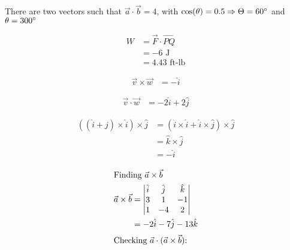 \documentclass[10pt]{extarticle}
\begin{document}
\begin{problem}{13.3}
\begin{description}[font=\normalfont]
\begin{enumerate}[(a)]
        \end{enumerate}
      \item[54:] There are two vectors such that $\vec a \cdot \vec b = 4$, with $\cos(\theta) = 0.5 \Rightarrow \Theta = 60\degree$ and $\theta = 300\degree$
      \item[60:]
        \begin{align*}
          W &= \vec F \cdot \overrightarrow{PQ}\\
            &= -6\text{ J}\\
            &= 4.43\text{ ft-lb}
        \end{align*}
    \end{description}
  \end{problem}
  \begin{problem}{13.4}
    \begin{description}[font=\normalfont]
      \item[2:]
        \begin{align*}
          \vec v \times \vec w &= -\hat{i}
        \end{align*}
      \item[4:]
        \begin{align*}
          \vec v \cdot \vec w &= -2\hat{i} + 2\hat{j}
        \end{align*}
      \item[10:]
        \begin{align*}
          \left((\hat{i} + \hat{j})\times \hat{i}\right)\times \hat{j} &= (\hat{i}\times\hat{i} + \hat{i}\times\hat{j})\times\hat{j}\\
                                                                       &= \hat{k}\times\hat{j}\\
                                                                       &= -\hat{i}
        \end{align*}
      \item[12:]
        \begin{align*}
          \shortintertext{Finding $\vec a \times \vec b$}
          \vec a \times \vec b &= 
          \begin{vmatrix}
            \hat{i} & \hat{j} & \hat{k} \\
            3 & 1 & -1\\
            1 & -4 & 2
          \end{vmatrix}\\
                               &= -2\hat{i} - 7\hat{j} -13\hat{k}\\
          \shortintertext{Checking $\vec a\cdot(\vec a\times \vec b)$:}

\end{align*}
\end{description}
\end{problem}
\end{document}
